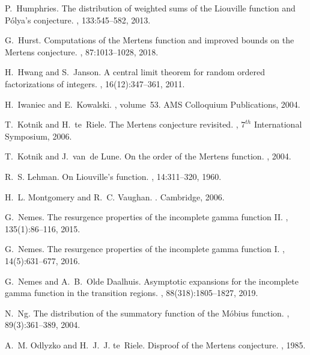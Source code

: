 \documentclass[11pt,reqno,a4letter]{article}
\numberwithin{figure}{section}
\numberwithin{table}{section}
\theoremstyle{plain}
\numberwithin{theorem}{section}
\theoremstyle{definition}
\begin{document}
\begin{thebibliography}{10}
P.~Humphries.
\newblock The distribution of weighted sums of the {L}iouville function and
  {P}\'{o}lya's conjecture.
, 133:545--582, 2013.

G.~Hurst.
\newblock Computations of the {M}ertens function and improved bounds on the
  {M}ertens conjecture.
, 87:1013--1028, 2018.

H.~Hwang and S.~Janson.
\newblock A central limit theorem for random ordered factorizations of
  integers.
, 16(12):347--361, 2011.

H.~Iwaniec and E.~Kowalski.
, volume~53.
\newblock AMS Colloquium Publications, 2004.

T.~Kotnik and H.~te~Riele.
\newblock The {M}ertens conjecture revisited.
, $7^{th}$ International Symposium,
  2006.

T.~Kotnik and J.~van~de Lune.
\newblock On the order of the {M}ertens function.
, 2004.

R.~S. Lehman.
\newblock On {L}iouville's function.
, 14:311--320, 1960.

H.~L. Montgomery and R.~C. Vaughan.
.
\newblock Cambridge, 2006.

G.~Nemes.
\newblock The resurgence properties of the incomplete gamma function {II}.
, 135(1):86--116, 2015.

G.~Nemes.
\newblock The resurgence properties of the incomplete gamma function {I}.
, 14(5):631--677, 2016.

G.~Nemes and A.~B.~Olde Daalhuis.
\newblock Asymptotic expansions for the incomplete gamma function in the
  transition regions.
, 88(318):1805--1827, 2019.

N.~Ng.
\newblock The distribution of the summatory function of the {M}{\'{o}}bius
  function.
, 89(3):361--389, 2004.

A.~M. Odlyzko and H.~J.~J. te~Riele.
\newblock Disproof of the {M}ertens conjecture.
, 1985.


\end{thebibliography}
\end{document}
